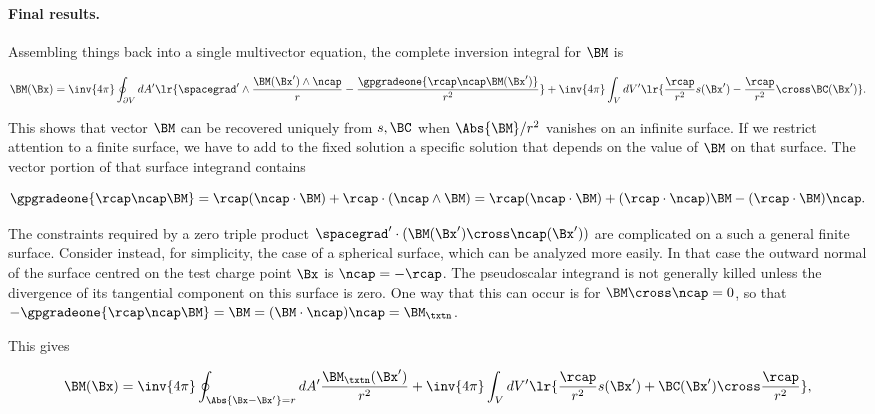 \paragraph{Final results.}

Assembling things back into a single multivector equation, the complete inversion integral for \( \BM \) is

\begin{dmath}\label{eqn:emtProblemSet1Problem5AppendixGA:600}
\BM(\Bx)
=
\inv{4 \pi} \oint_{\partial V} dA'
\lr{
\spacegrad' \wedge
\frac{\BM(\Bx') \wedge \ncap}{r}
-\frac{\gpgradeone{ \rcap \ncap \BM(\Bx') }}{r^2}
}
+
\inv{4 \pi} \int_V dV' \lr{
\frac{\rcap}{r^2} s(\Bx') -
\frac{\rcap}{r^2} \cross \BC(\Bx') }.
\end{dmath}

This shows that vector \( \BM \) can be recovered uniquely from \( s, \BC \) when \( \Abs{\BM}/r^2 \) vanishes on an infinite surface.
If we restrict attention to a finite surface, we have to add to the fixed solution a specific solution that depends on the value of \( \BM \) on that surface.  The vector portion of that surface integrand contains

\begin{dmath}\label{eqn:emtProblemSet1Problem5AppendixGA:640}
\gpgradeone{ \rcap \ncap \BM }
=
\rcap (\ncap \cdot \BM )
+
\rcap \cdot (\ncap \wedge \BM )
=
\rcap (\ncap \cdot \BM )
+
(\rcap \cdot \ncap) \BM
-
(\rcap \cdot \BM ) \ncap.
\end{dmath}

The constraints required by a zero triple product \( \spacegrad' \cdot (\BM(\Bx') \cross \ncap(\Bx')) \) are complicated on a such a general finite surface.
Consider instead, for simplicity, the case of a spherical surface, which can be analyzed more easily.
In that case the outward normal of the surface centred on the test charge point \( \Bx \) is \( \ncap = -\rcap \).  The pseudoscalar integrand is not generally killed unless the divergence of its tangential component on this surface is zero.  One way that this can occur is for \( \BM \cross \ncap = 0 \), so that \( -\gpgradeone{ \rcap \ncap \BM } = \BM = (\BM \cdot \ncap) \ncap = \BM_\txtn \).

This gives

\begin{dmath}\label{eqn:emtProblemSet1Problem5AppendixGA:620}
\BM(\Bx)
=
\inv{4 \pi} \oint_{\Abs{\Bx - \Bx'} = r} dA' \frac{\BM_\txtn(\Bx')}{r^2}
+
\inv{4 \pi} \int_V dV' \lr{
\frac{\rcap}{r^2} s(\Bx') +
\BC(\Bx') \cross \frac{\rcap}{r^2} },
\end{dmath}

